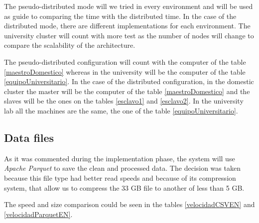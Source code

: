 The pseudo-distributed mode will we tried in every environment and will be used as guide to comparing the time with the distributed time. In the case of the distributed mode, there are different implementations for each environment. The university cluster will count with more test as the number of nodes will change to compare the scalability of the architecture.

The pseudo-distributed configuration will count with the computer of the table \ref{maestroDomestico} whereas in the university will be the computer of the table \ref{equipoUniversitario}. In the case of the distributed configuration, in the domestic cluster the master will be the computer of the table \ref{maestroDomestico} and the slaves will be the ones on the tables \ref{esclavo1} and \ref{esclavo2}. In the university lab all the machines are the same, the one of the table \ref{equipoUniversitario}.

\subsection{Data files}
As it was commented during the implementation phase, the system will use \textit{Apache Parquet} to save the clean and processed data. The decision was taken because this file type had better read speeds and because of its compression system, that allow us to compress the 33 \gls{GB} file to another of less than 5 GB.

The speed and size comparison could be seen in the tables \ref{velocidadCSVEN} and \ref{velocidadParquetEN}.

